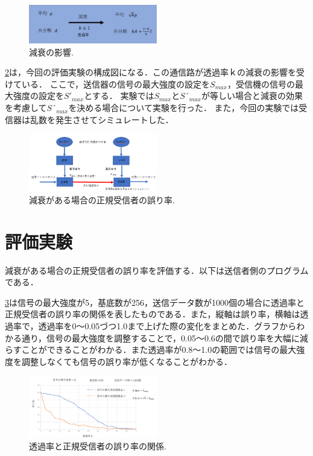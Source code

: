 \documentclass[a4j,twocolumn]{jarticle}
\def \figref #1{\figurename\ref{#1}}
\begin{document}
\begin{figure}[htbp]
        \centering   
        \includegraphics[width=0.5\textwidth]{img/zemi6.png}
        \caption[sample image (png)]{減衰の影響.}
        \label{Fig:5_1}
    \end{figure}





\figref{Fig:5_2}は，今回の評価実験の構成図になる．この通信路が透過率$ｋ$の減衰の影響を受けている．
ここで，送信器の信号の最大強度の設定を$S_{max}$，受信機の信号の最大強度の設定を$S'_{max}$とする．
実験では$S_{max}$と$S´_{max}$が等しい場合と減衰の効果を考慮して$S´_{max}$を決める場合について実験を行った．
また，今回の実験では受信器は乱数を発生させてシミュレートした．
\begin{figure}[H]
        \centering   
        \includegraphics[width=0.5\textwidth]{img/zemi7.png}
        \caption[sample image (png)]{減衰がある場合の正規受信者の誤り率.}
        \label{Fig:5_2}
    \end{figure}


\section{評価実験}
減衰がある場合の正規受信者の誤り率を評価する．以下は送信者側のプログラムである．



\figref{Fig:5_3}は信号の最大強度が5，基底数が256，送信データ数が1000個の場合に透過率と正規受信者の誤り率の関係を表したものである．また，縦軸は誤り率，横軸は透過率で，透過率を0〜0.05づつ1.0まで上げた際の変化をまとめた．グラフからわかる通り，信号の最大強度を調整することで，0.05〜0.6の間で誤り率を大幅に減らすことができることがわかる．また透過率が0.8～1.0の範囲では信号の最大強度を調整しなくても信号の誤り率が低くなることがわかる．
\begin{figure}[htbp]
        \centering   
        \includegraphics[width=0.5\textwidth]{img/zemi8.png}
        \caption[sample image (png)]{透過率と正規受信者の誤り率の関係.}
        \label{Fig:5_3}
    \end{figure}
\end{document}
